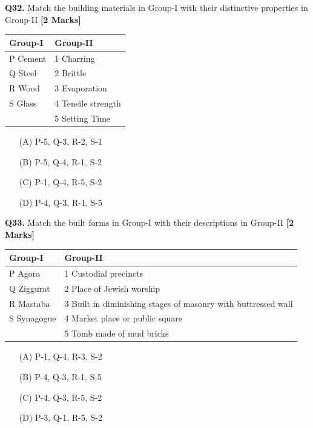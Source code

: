 \documentclass[11pt]{article}
\newcommand{\questionb}[2]{
    \noindent\textbf{Q#2.} #1 \hfill \textbf{[2 Marks]}
}
\begin{document}
\questionb{Match the building materials in Group-I with their distinctive properties in Group-II}{32}
\begin{tabularx}{\textwidth}{|l|X|}
\hline
\textbf{Group-I} & \textbf{Group-II} \\
\hline
P Cement & 1 Charring \\
Q Steel & 2 Brittle \\
R Wood & 3 Evaporation \\
S Glass & 4 Tensile strength \\
 & 5 Setting Time \\
\hline
\end{tabularx}
\begin{enumerate}
    \item[(A)] P-5, Q-3, R-2, S-1
    \item[(B)] P-5, Q-4, R-1, S-2
    \item[(C)] P-1, Q-4, R-5, S-2
    \item[(D)] P-4, Q-3, R-1, S-5
\end{enumerate}
\vspace{0.5cm}

\questionb{Match the built forms in Group-I with their descriptions in Group-II}{33}
\begin{tabularx}{\textwidth}{|l|X|}
\hline
\textbf{Group-I} & \textbf{Group-II} \\
\hline
P Agora & 1 Custodial precincts \\
Q Ziggurat & 2 Place of Jewish worship \\
R Mastaba & 3 Built in diminishing stages of masonry with buttressed wall \\
S Synagogue & 4 Market place or public square \\
 & 5 Tomb made of mud bricks \\
\hline
\end{tabularx}
\begin{enumerate}
    \item[(A)] P-1, Q-4, R-3, S-2
    \item[(B)] P-4, Q-3, R-1, S-5
    \item[(C)] P-4, Q-3, R-5, S-2
    \item[(D)] P-3, Q-1, R-5, S-2
\end{enumerate}
\vspace{0.5cm}
\end{document}

